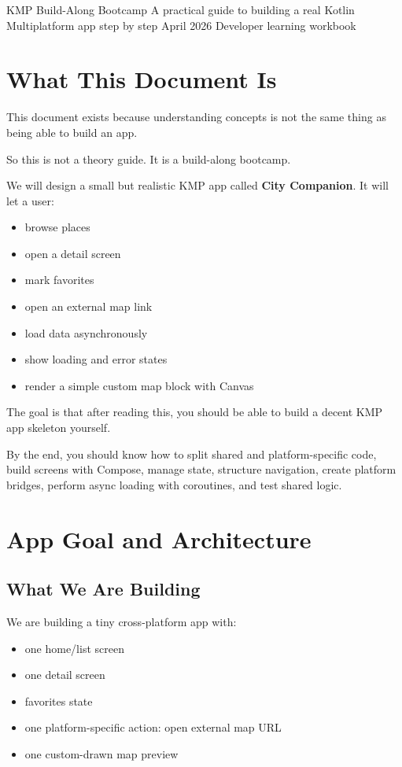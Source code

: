 \documentclass[11pt,a4paper]{article}
\begin{document}
\KazeCover
  {KMP Build-Along Bootcamp}
  {A practical guide to building a real Kotlin Multiplatform app step by step}
  {April 2026}
  {Developer learning workbook}

\KazeDocumentNotice

\section{What This Document Is}

This document exists because understanding concepts is not the same thing as being able to build an app.

So this is not a theory guide.
It is a build-along bootcamp.

We will design a small but realistic KMP app called \textbf{City Companion}. It will let a user:
\begin{itemize}
    \item browse places
    \item open a detail screen
    \item mark favorites
    \item open an external map link
    \item load data asynchronously
    \item show loading and error states
    \item render a simple custom map block with Canvas
\end{itemize}

The goal is that after reading this, you should be able to build a decent KMP app skeleton yourself.

\begin{kazecalloutbox}
By the end, you should know how to split shared and platform-specific code, build screens with Compose, manage state, structure navigation, create platform bridges, perform async loading with coroutines, and test shared logic.
\end{kazecalloutbox}

\section{App Goal and Architecture}

\subsection{What We Are Building}

We are building a tiny cross-platform app with:
\begin{itemize}
    \item one home/list screen
    \item one detail screen
    \item favorites state
    \item one platform-specific action: open external map URL
    \item one custom-drawn map preview
\end{itemize}
\end{document}
